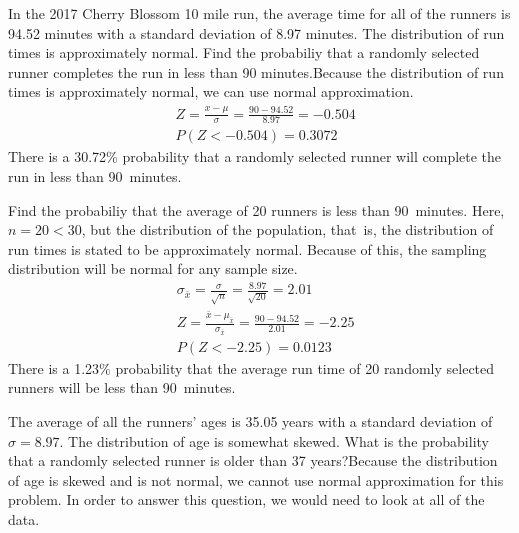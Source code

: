 \begin{examplewrap}
\begin{nexample}{
In the 2017 Cherry Blossom 10 mile run, the average time for all of the runners is 94.52 minutes with a standard deviation of 8.97 minutes. The distribution of run times is approximately normal. Find the probabiliy that a randomly selected runner completes the run in less than 90 minutes.}Because the distribution of run times is approximately normal, we can use normal approximation.
\begin{align*}
&Z = \frac{x - \mu}{\sigma}=\frac{90-94.52}{8.97}=-0.504 \\
&P(Z < -0.504) = 0.3072
\end{align*}
There is a 30.72\% probability that a randomly selected runner will complete the run in less than 90~minutes.
\end{nexample}
\end{examplewrap}

\begin{examplewrap}
\begin{nexample}{
Find the probabiliy that the average of 20 runners is less than 90~minutes.}
Here, $n=20<30$, but the distribution of the population, that~is, the distribution of run times is stated to be approximately normal. Because of this, the sampling distribution will be normal for any sample size.
\begin{align*}
&\sigma_{\bar{x}}=\frac{\sigma}{\sqrt{n}}=\frac{8.97}{\sqrt{20}}=2.01 \\
&Z = \frac{\bar{x} - \mu_{\bar{x}}}{\sigma_{\bar{x}}}=\frac{90-94.52}{2.01}=-2.25\\
&P(Z < -2.25) = 0.0123
\end{align*}
There is a 1.23\% probability that the average run time of 20 randomly selected runners will be less than 90~minutes.
\end{nexample}
\end{examplewrap}

\D{\newpage}

\begin{examplewrap}
\begin{nexample}{
The average of all the runners' ages is 35.05 years with a standard deviation of $\sigma = 8.97$. The distribution of age is somewhat skewed. What is the probability that a randomly selected runner is older than 37 years?}Because the distribution of age is skewed and is not normal, we cannot use normal approximation for this problem. In order to answer this question, we would need to look at all of the data.
\end{nexample}
\end{examplewrap}

